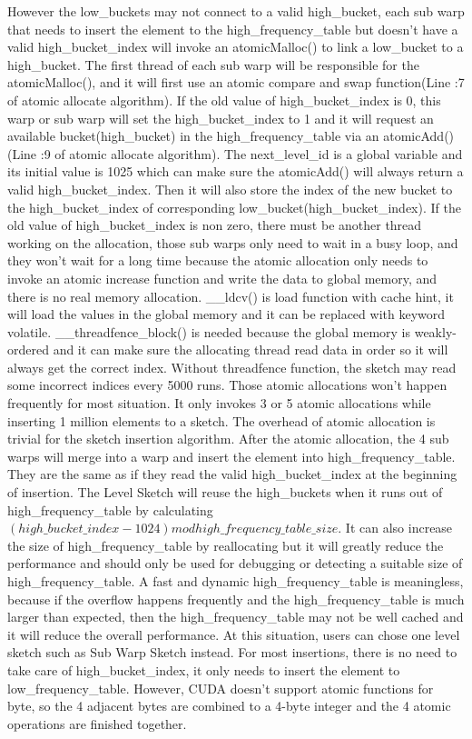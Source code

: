 \documentclass[conference]{IEEEtran}
\begin{document}
However the low\_buckets may not connect to a valid high\_bucket, each sub warp that needs to insert the element to the high\_frequency\_table but doesn't have a valid high\_bucket\_index will invoke an atomicMalloc() to link a low\_bucket to a high\_bucket. The first thread of each sub warp will be responsible for the atomicMalloc(), and it will first use an atomic compare and swap function(Line :7 of atomic allocate algorithm). If the old value of high\_bucket\_index is 0, this warp or sub warp will set the high\_bucket\_index to 1 and it will request an available bucket(high\_bucket) in the high\_frequency\_table via an atomicAdd()(Line :9 of atomic allocate algorithm). The next\_level\_id is a global variable and its initial value is 1025 which can make sure the atomicAdd() will always return a valid high\_bucket\_index. Then it will also store the index of the new bucket to the high\_bucket\_index of corresponding low\_bucket(high\_bucket\_index). If the old value of high\_bucket\_index is non zero, there must be another thread working on the allocation, those sub warps only need to wait in a busy loop, and they won't wait for a long time because the atomic allocation only needs to invoke an atomic increase function and write the data to global memory, and there is no real memory allocation. \_\_ldcv() is load function with cache hint, it will load the values in the global memory and it can be replaced with keyword volatile. \_\_threadfence\_block() is needed because the global memory is weakly-ordered and it can make sure the allocating thread read data in order so it will always get the correct index. Without threadfence function, the sketch may read some incorrect indices every 5000 runs. Those atomic allocations won't happen frequently for most situation. It only invokes 3 or 5 atomic allocations while inserting 1 million elements to a sketch. The overhead of atomic allocation is trivial for the sketch insertion algorithm. After the atomic allocation, the 4 sub warps will merge into a warp and insert the element into high\_frequency\_table. They are the same as if they read the valid high\_bucket\_index at the beginning of insertion. The Level Sketch will reuse the high\_buckets when it runs out of high\_frequency\_table by calculating $(high\_bucket\_index - 1024) mod high\_frequency\_table\_size$. It can also increase the size of high\_frequency\_table by reallocating but it will greatly reduce the performance and should only be used for debugging or detecting a suitable size of high\_frequency\_table. A fast and dynamic high\_frequency\_table is meaningless, because if the overflow happens frequently and the high\_frequency\_table is much larger than expected, then the high\_frequency\_table may not be well cached and it will reduce the overall performance. At this situation, users can chose one level sketch such as Sub Warp Sketch instead. For most insertions, there is no need to take care of high\_bucket\_index, it only needs to insert the element to low\_frequency\_table. However, CUDA doesn't support atomic functions for byte, so the 4 adjacent bytes are combined to a 4-byte integer and the 4 atomic operations are finished together. 
\end{document}
